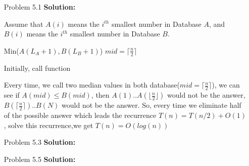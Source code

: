 \normalfont\documentclass[letterpaper,11pt]{article}
\begin{document}
\setlength{\parindent}{2ex}
\newcommand{\header}{
	\noindent {}
}
\bigskip
\header

\begin{enumerate}
\item [Problem 5.1]\textbf{Solution:}\par
	Assume that $A(i)$ means the $i^{th}$ smallest number in Database $A$, and $B(i)$ means the $i^{th}$ smallest number in Database $B$.\par
	\begin{algorithmic}
				\State \Return Min($A(L_A + 1), B(L_B + 1)$)
			\EndIf
			\State $mid = \lceil \frac{n}{2} \rceil$
				\State {}
			\Else
				\State {}
			\EndIf
		\EndFunction
	\end{algorithmic}
	Initially, call function  \par
	Every time, we call two median values in both database($mid = \lceil \frac{n}{2} \rceil$), we can see if $A(mid) \le B(mid)$, then $A(1)..A(\lfloor \frac{n}{2} \rfloor)$ would not be the answer, $B(\lceil \frac{n}{2} \rceil)..B(N)$ would not be the answer. So, every time we eliminate half of the possible answer which leads the recurrence $T(n) = T(n / 2) + O(1)$, solve this recurrence,we get $T(n) = O(log(n))$
\item [Problem 5.3]\textbf{Solution:}\par
\item [Problem 5.5]\textbf{Solution:}\par

\end{enumerate}
\end{document}
